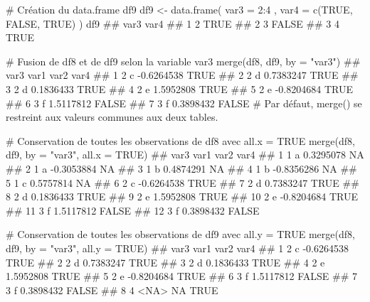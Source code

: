 \documentclass[12pt,twosided, notitlepage]{book}
\newenvironment{Shaded}{}{}
\newcommand{\KeywordTok}[1]{\textcolor[rgb]{0.00,0.00,1.00}{#1}}
\newcommand{\DataTypeTok}[1]{#1}
\newcommand{\DecValTok}[1]{#1}
\newcommand{\StringTok}[1]{\textcolor[rgb]{0.00,0.50,0.50}{#1}}
\newcommand{\CommentTok}[1]{\textcolor[rgb]{0.00,0.50,0.00}{#1}}
\newcommand{\OtherTok}[1]{\textcolor[rgb]{1.00,0.25,0.00}{#1}}
\newcommand{\OperatorTok}[1]{#1}
\newcommand{\NormalTok}[1]{#1}
\renewenvironment{Shaded}{\begin{snugshade}}{\end{snugshade}}
\begin{document}
\begin{Shaded}
\begin{Highlighting}[]
\CommentTok{# Création du data.frame df9}
\NormalTok{df9 <-}\StringTok{ }\KeywordTok{data.frame}\NormalTok{(}
  \DataTypeTok{var3 =} \DecValTok{2}\OperatorTok{:}\DecValTok{4}
\NormalTok{  , }\DataTypeTok{var4 =} \KeywordTok{c}\NormalTok{(}\OtherTok{TRUE}\NormalTok{, }\OtherTok{FALSE}\NormalTok{, }\OtherTok{TRUE}\NormalTok{)}
\NormalTok{)}
\NormalTok{df9}
\NormalTok{  ##   var3  var4}
\NormalTok{  ## 1    2  TRUE}
\NormalTok{  ## 2    3 FALSE}
\NormalTok{  ## 3    4  TRUE}

\CommentTok{# Fusion de df8 et de df9 selon la variable var3}
\KeywordTok{merge}\NormalTok{(df8, df9, }\DataTypeTok{by =} \StringTok{"var3"}\NormalTok{)}
\NormalTok{  ##   var3 var1       var2  var4}
\NormalTok{  ## 1    2    c -0.6264538  TRUE}
\NormalTok{  ## 2    2    d  0.7383247  TRUE}
\NormalTok{  ## 3    2    d  0.1836433  TRUE}
\NormalTok{  ## 4    2    e  1.5952808  TRUE}
\NormalTok{  ## 5    2    e -0.8204684  TRUE}
\NormalTok{  ## 6    3    f  1.5117812 FALSE}
\NormalTok{  ## 7    3    f  0.3898432 FALSE}
\CommentTok{# Par défaut, merge() se restreint aux valeurs communes aux deux tables.}

\CommentTok{# Conservation de toutes les observations de df8 avec all.x = TRUE}
\KeywordTok{merge}\NormalTok{(df8, df9, }\DataTypeTok{by =} \StringTok{"var3"}\NormalTok{, }\DataTypeTok{all.x =} \OtherTok{TRUE}\NormalTok{)}
\NormalTok{  ##    var3 var1       var2  var4}
\NormalTok{  ## 1     1    a  0.3295078    NA}
\NormalTok{  ## 2     1    a -0.3053884    NA}
\NormalTok{  ## 3     1    b  0.4874291    NA}
\NormalTok{  ## 4     1    b -0.8356286    NA}
\NormalTok{  ## 5     1    c  0.5757814    NA}
\NormalTok{  ## 6     2    c -0.6264538  TRUE}
\NormalTok{  ## 7     2    d  0.7383247  TRUE}
\NormalTok{  ## 8     2    d  0.1836433  TRUE}
\NormalTok{  ## 9     2    e  1.5952808  TRUE}
\NormalTok{  ## 10    2    e -0.8204684  TRUE}
\NormalTok{  ## 11    3    f  1.5117812 FALSE}
\NormalTok{  ## 12    3    f  0.3898432 FALSE}

\CommentTok{# Conservation de toutes les observations de df9 avec all.y = TRUE}
\KeywordTok{merge}\NormalTok{(df8, df9, }\DataTypeTok{by =} \StringTok{"var3"}\NormalTok{, }\DataTypeTok{all.y =} \OtherTok{TRUE}\NormalTok{)}
\NormalTok{  ##   var3 var1       var2  var4}
\NormalTok{  ## 1    2    c -0.6264538  TRUE}
\NormalTok{  ## 2    2    d  0.7383247  TRUE}
\NormalTok{  ## 3    2    d  0.1836433  TRUE}
\NormalTok{  ## 4    2    e  1.5952808  TRUE}
\NormalTok{  ## 5    2    e -0.8204684  TRUE}
\NormalTok{  ## 6    3    f  1.5117812 FALSE}
\NormalTok{  ## 7    3    f  0.3898432 FALSE}
\NormalTok{  ## 8    4 <NA>         NA  TRUE}
\end{Highlighting}
\end{Shaded}
\end{document}
